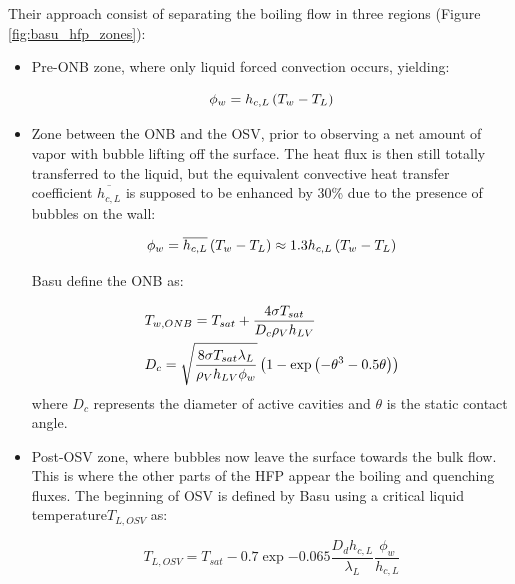 Their approach consist of separating the boiling flow in three regions (Figure \ref{fig:basu_hfp_zones}):

\begin{itemize}
\item Pre-ONB zone, where only liquid forced convection occurs, yielding:

\begin{equation}
\phi_{w}=h_{c,L} \left( T_{w}-T_{L} \right)
\label{eq:basu_hfp_preONB}
\end{equation}

\item Zone between the ONB and the OSV, prior to observing a net amount of vapor with bubble lifting off the surface. The heat flux is then still totally transferred to the liquid, but the equivalent convective heat transfer coefficient $\overline{h_{c,L}}$ is supposed to be enhanced by 30\% due to the presence of bubbles on the wall:

\begin{equation}
\phi_{w}=\overline{h_{c,L}} \left( T_{w}-T_{L} \right)\approx 1.3 h_{c,L}\left( T_{w}-T_{L} \right)
\label{eq:basu_hfp_postONB}
\end{equation}

Basu \etal define the ONB as:

\begin{align}
&T_{w, ONB}= T_{sat} + \frac{4 \sigma T_{sat}}{D_{c}\rho_{V} h_{LV}}\\
%
&D_{c}= \sqrt{\frac{8 \sigma T_{sat} \lambda_{L}}{\rho_{V} h_{LV} \phi_{w}}}\parth{ 1- \exp{ - \theta^{3} - 0.5 \theta}  }
\label{eq:basu_hfp_ONB}
\end{align}
where $D_{c}$ represents the diameter of active cavities and $\theta$ is the static contact angle.

\item Post-OSV zone, where bubbles now leave the surface towards the bulk flow. This is where the other parts of the HFP appear \ie the boiling and quenching fluxes. The beginning of OSV is defined by Basu \etal using a critical liquid temperature$T_{L,OSV}$ as:

\begin{equation}
T_{L,OSV}=T_{sat}-0.7\exp{-0.065 \frac{D_{d}h_{c,L}}{\lambda_{L}}}\frac{\phi_{w}}{h_{c,L}}
\label{eq:basu_hfp_TLOSV}
\end{equation}

\end{itemize}


